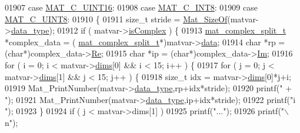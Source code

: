 \begin{DoxyCode}
{{{{{{{{{{{{{{{{{{{{{{{{{{{{{{{{{{{{{{{{01907             \textcolor{keywordflow}{case} \hyperlink{group___m_a_t_ggad4d60ae7b709fc81bfd744fb4c857c40a8bede21dbf6c1edc0bbccc1481bccae7}{MAT\_C\_UINT16}:
01908             \textcolor{keywordflow}{case} \hyperlink{group___m_a_t_ggad4d60ae7b709fc81bfd744fb4c857c40a984ff310f9e906100fcff95f704f43c5}{MAT\_C\_INT8}:
01909             \textcolor{keywordflow}{case} \hyperlink{group___m_a_t_ggad4d60ae7b709fc81bfd744fb4c857c40a81270f8093cb4808e992c1d29d84d4e3}{MAT\_C\_UINT8}:
01910             \{
01911                 \textcolor{keywordtype}{size\_t} stride = \hyperlink{group__mat__util_gab6774aabdc124c540c1e7686d0804940}{Mat\_SizeOf}(matvar->\hyperlink{group___m_a_t_ab6aafe9bd77f0f077852593dec438144}{data\_type});
01912                 \textcolor{keywordflow}{if} ( matvar->\hyperlink{group___m_a_t_aeb03b3a69f108dc05470b00443a43739}{isComplex} ) \{
01913                     \hyperlink{group___m_a_t_structmat__complex__split__t}{mat\_complex\_split\_t} *complex\_data = (
      \hyperlink{group___m_a_t_structmat__complex__split__t}{mat\_complex\_split\_t}*)matvar->\hyperlink{group___m_a_t_a5672978efa230bbdecdf38ede781f7fa}{data};
01914                     \textcolor{keywordtype}{char} *rp = (\textcolor{keywordtype}{char}*)complex\_data->\hyperlink{group___m_a_t_a484a93607508adac2bce53a0252e0325}{Re};
01915                     \textcolor{keywordtype}{char} *ip = (\textcolor{keywordtype}{char}*)complex\_data->\hyperlink{group___m_a_t_a7182d10b0d3598415887376065440946}{Im};
01916                     for ( i = 0; i < matvar->\hyperlink{group___m_a_t_a8e01234e1c862ce3472bb37f5a09b92c}{dims}[0] && i < 15; i++ ) \{
01917                         \textcolor{keywordflow}{for} ( j = 0; j < matvar->\hyperlink{group___m_a_t_a8e01234e1c862ce3472bb37f5a09b92c}{dims}[1] && j < 15; j++ ) \{
01918                             \textcolor{keywordtype}{size\_t} idx = matvar->\hyperlink{group___m_a_t_a8e01234e1c862ce3472bb37f5a09b92c}{dims}[0]*j+i;
01919                             Mat\_PrintNumber(matvar->\hyperlink{group___m_a_t_ab6aafe9bd77f0f077852593dec438144}{data\_type},rp+idx*stride);
01920                             printf(\textcolor{stringliteral}{" + "});
01921                             Mat\_PrintNumber(matvar->\hyperlink{group___m_a_t_ab6aafe9bd77f0f077852593dec438144}{data\_type},ip+idx*stride);
01922                             printf(\textcolor{stringliteral}{"i "});
01923                         \}
01924                         \textcolor{keywordflow}{if} ( j < matvar->dims[1] )
01925                             printf(\textcolor{stringliteral}{"..."});
01926                         printf(\textcolor{stringliteral}{"\(\backslash\)n"});
}}}}}}}}}}}}}}}}}}}}}}}}}}}}}}}}}}}}}}}}
\end{DoxyCode}
